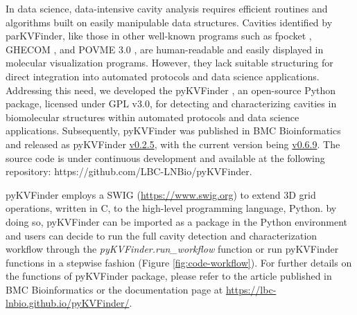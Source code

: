 \documentclass[Ingles]{phdthesis}
\begin{document}
In data science, data-intensive cavity analysis requires efficient routines and algorithms built on easily manipulable data structures. Cavities identified by parKVFinder, like those in other well-known programs such as fpocket \cite{fpocket}, GHECOM \cite{ghecom}, and POVME 3.0 \cite{povme}, are human-readable and easily displayed in molecular visualization programs. However, they lack suitable structuring for direct integration into automated protocols and data science applications. Addressing this need, we developed the \ac{pyKVFinder} \cite{guerra2021}, an open-source Python package, licensed under GPL v3.0, for detecting and characterizing cavities in biomolecular structures within automated protocols and data science applications. Subsequently, pyKVFinder was published in BMC Bioinformatics \cite{guerra2021} and released as pyKVFinder \href{https://github.com/LBC-LNBio/pyKVFinder/tree/v0.2.5}{v0.2.5}, with the current version being \href{https://github.com/LBC-LNBio/pyKVFinder/tree/v0.6.9}{v0.6.9}. The source code is under continuous development and available at the following repository: https://github.com/LBC-LNBio/pyKVFinder.

pyKVFinder employs a \ac{SWIG} (\url{https://www.swig.org}) to extend \acs{3D} grid operations, written in C, to the high-level programming language, Python. by doing so, pyKVFinder can be imported as a package in the Python environment and users can decide to run the full cavity detection and characterization workflow through the \textit{pyKVFinder.run\_workflow} function or run pyKVFinder functions in a stepwise fashion (Figure \ref{fig:code-workflow}). For further details on the functions of pyKVFinder package, please refer to the article published in BMC Bioinformatics \cite{guerra2021} or the documentation page at \url{https://lbc-lnbio.github.io/pyKVFinder/}.
\end{document}
